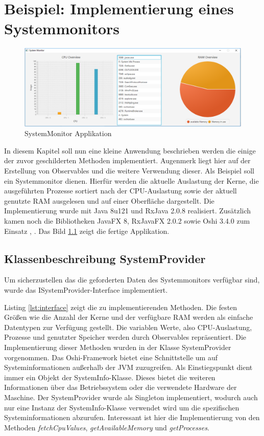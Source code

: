 \chapter{Beispiel: Implementierung eines Systemmonitors}\label{beispiel}
\begin{figure}[hbt]
	\centering
	\includegraphics[width=1\textwidth]{Abb/sysmon}
	\caption{SystemMonitor Applikation}
	\label{pic:sysmon}
\end{figure}
In diesem Kapitel soll nun eine kleine Anwendung beschrieben werden die einige der zuvor geschilderten Methoden implementiert. Augenmerk liegt hier auf der Erstellung von Observables und die weitere Verwendung dieser. Als Beispiel soll ein Systemmonitor dienen. Hierfür werden die aktuelle Auslastung der Kerne, die ausgeführten Prozesse sortiert nach der CPU-Auslastung sowie der aktuell genutzte RAM ausgelesen und auf einer Oberfläche dargestellt. Die Implementierung wurde mit Java 8u121 und RxJava 2.0.8 realisiert. Zusätzlich kamen noch die Bibliotheken JavaFX 8, RxJavaFX 2.0.2 sowie Oshi 3.4.0 zum Einsatz \cite{rxajavafx}, \cite{oshi}. Das Bild \ref{pic:sysmon} zeigt die fertige Applikation.
\section{Klassenbeschreibung SystemProvider}
Um sicherzustellen das die geforderten Daten des Systemmonitors verfügbar sind, wurde das ISystemProvider-Interface implementiert. 
 
Listing \ref{lst:interface} zeigt die zu implementierenden Methoden. Die festen Größen wie die Anzahl der Kerne und der verfügbare RAM werden als einfache Datentypen zur Verfügung gestellt. Die variablen Werte, also CPU-Auslastung, Prozesse und genutzter Speicher werden durch Observables repräsentiert. Die Implementierung dieser Methoden wurden in der Klasse SystemProvider vorgenommen. Das Oshi-Framework bietet eine Schnittstelle um auf Systeminformationen außerhalb der JVM zuzugreifen. Als Einstiegspunkt dient immer ein Objekt der SystemInfo-Klasse. Dieses bietet die weiteren Informationen über das Betriebssystem oder die verwendete Hardware der Maschine. Der SystemProvider wurde als Singleton implementiert, wodurch auch nur eine Instanz der SystemInfo-Klasse verwendet wird um die spezifischen Systeminformationen abzurufen. Interessant ist hier die Implementierung von den Methoden \textit{fetchCpuValues}, \textit{getAvailableMemory} und \textit{getProcesses}. 
